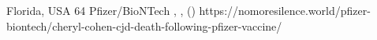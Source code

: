           {Florida, USA}
          {64}
          {Pfizer/BioNTech}
          {, }
          {
            ,
             ()
          }
          {https://nomoresilence.world/pfizer-biontech/cheryl-cohen-cjd-death-following-pfizer-vaccine/}


